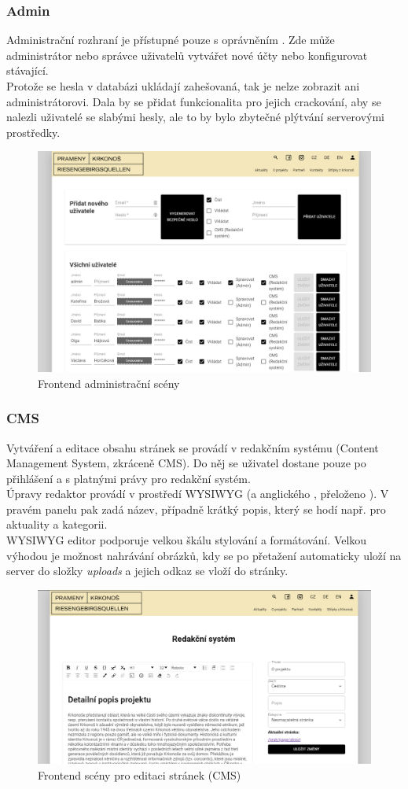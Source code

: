 \subsubsection{Admin}
Administrační rozhraní je přístupné pouze s oprávněním .
Zde může administrátor nebo správce uživatelů vytvářet nové účty nebo
konfigurovat stávající.\\
Protože se hesla v databázi ukládají zahešovaná, tak je nelze zobrazit ani administrátorovi.
Dala by se přidat funkcionalita pro jejich crackování, aby se nalezli uživatelé se
slabými hesly, ale to by bylo zbytečné plýtvání serverovými prostředky.
\begin{figure}[H]
	\centering
	\includegraphics[width=.8\linewidth]{img/adminScene.png}
	\caption{Frontend administrační scény}
\end{figure}

\subsubsection{CMS}
Vytváření a editace obsahu stránek se provádí v redakčním systému (Content Management System, zkráceně CMS).
Do něj se uživatel dostane pouze po přihlášení a s platnými právy pro redakční systém.\\
Úpravy redaktor provádí v prostředí WYSIWYG (a anglického , přeloženo ).
V pravém panelu pak zadá název, případně krátký popis, který se hodí např. pro aktuality a kategorii.\\
WYSIWYG editor podporuje velkou škálu stylování a formátování. Velkou výhodou je možnost nahrávání obrázků,
kdy se po přetažení automaticky uloží na server do složky \textit{uploads} a jejich odkaz se vloží do stránky.
\begin{figure}[H]
	\centering
	\includegraphics[width=.8\linewidth]{img/cmsScene.png}
	\caption{Frontend scény pro editaci stránek (CMS)}
\end{figure}

